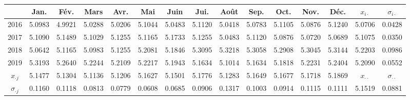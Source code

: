 \begin{tabular}{ccccccccccccccc}
    \toprule
        & Jan. & Fév. & Mars & Avr. & Mai & Juin & Jui. & Août & Sep. & Oct. & Nov. & Déc. & $x_{i\cdot}$ & $\sigma_{i\cdot}$ \\
    \midrule
        2016 & 5.0983 & 4.9921 & 5.0288 & 5.0206 & 5.1044 & 5.0483 & 5.1120 & 5.0418 & 5.0783 & 5.1105 & 5.0876 & 5.1240 & 5.0706 & 0.0428 \\ 
        2017 & 5.1090 & 5.1489 & 5.1029 & 5.1255 & 5.1165 & 5.1733 & 5.1255 & 5.0483 & 5.1120 & 5.0876 & 5.0720 & 5.0689 & 5.1075 & 0.0350 \\ 
        2018 & 5.0642 & 5.1165 & 5.0983 & 5.1255 & 5.2081 & 5.1846 & 5.3095 & 5.3218 & 5.3058 & 5.2908 & 5.3045 & 5.3144 & 5.2203 & 0.0986 \\ 
        2019 & 5.3193 & 5.2640 & 5.2244 & 5.2109 & 5.2217 & 5.1943 & 5.1634 & 5.1014 & 5.1634 & 5.1818 & 5.2231 & 5.2404 & 5.2090 & 0.0552 \\
    \midrule
        $x_{\cdot j}$ & 5.1477 & 5.1304 & 5.1136 & 5.1206 & 5.1627 & 5.1501 & 5.1776 & 5.1283 & 5.1649 & 5.1677 & 5.1718 & 5.1869 & $x_{\cdot\cdot}$ & $\sigma_{\cdot\cdot}$ \\ 
        $\sigma_{\cdot j}$ & 0.1160 & 0.1118 & 0.0813 & 0.0779 & 0.0608 & 0.0685 & 0.0906 & 0.1317 & 0.1003 & 0.0914 & 0.1115 & 0.1111 & 5.1519 & 0.0881 \\
    \bottomrule
\end{tabular}